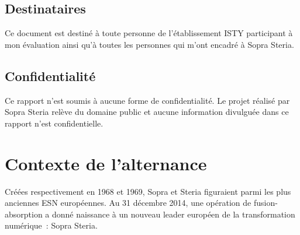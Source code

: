 \documentclass[12pt,a4paper]{article}
\begin{document}
\subsection{Destinataires}
Ce document est destiné à toute personne de l'établissement ISTY participant à mon évaluation ainsi qu'à toutes les personnes qui m'ont encadré à Sopra Steria.\\
\subsection{Confidentialité}
Ce rapport n'est soumis à aucune forme de confidentialité. Le projet réalisé par Sopra Steria relève du domaine public et aucune information divulguée dans ce rapport n'est confidentielle.\\
\newpage
\section{Contexte de l'alternance}
Créées respectivement en 1968 et 1969, Sopra et Steria figuraient parmi les plus anciennes \gls{ESN} européennes. Au 31 décembre 2014, une opération de fusion-absorption a donné naissance à un nouveau leader européen de la transformation numérique~: Sopra Steria.
                      
\end{document}
